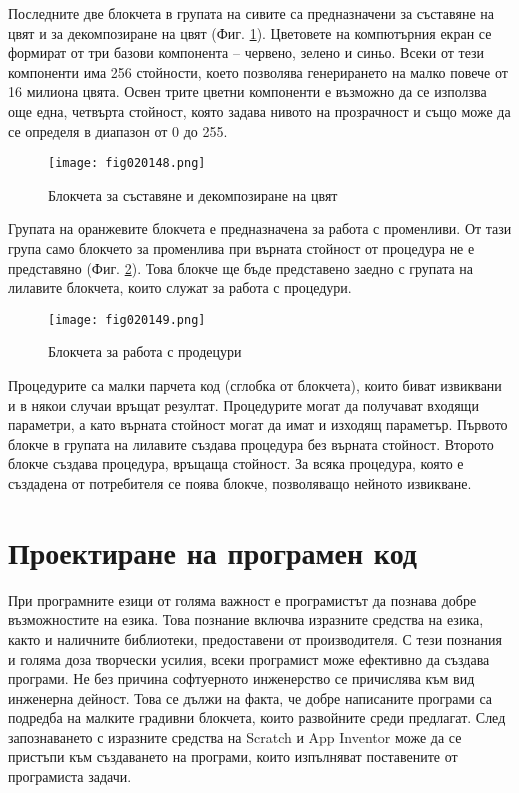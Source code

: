 Последните две блокчета в групата на сивите са предназначени за съставяне на цвят и за декомпозиране на цвят (Фиг. \ref{fig020148}). Цветовете на компютърния екран се формират от три базови компонента – червено, зелено и синьо. Всеки от тези компоненти има 256 стойности, което позволява генерирането на малко повече от 16 милиона цвята. Освен трите цветни компоненти е възможно да се използва още една, четвърта стойност, която задава нивото на прозрачност и също може да се определя в диапазон от 0 до 255.

\begin{figure}[H]
  \centering
  \texttt{[image: fig020148.png]}
  \caption{Блокчета за съставяне и декомпозиране на цвят}
\label{fig020148}
\end{figure}

Групата на оранжевите блокчета е предназначена за работа с променливи. От тази група само блокчето за променлива при върната стойност от процедура не е представяно (Фиг. \ref{fig020149}). Това блокче ще бъде представено заедно с групата на лилавите блокчета, които служат за работа с процедури.

\begin{figure}[H]
  \centering
  \texttt{[image: fig020149.png]}
  \caption{Блокчета за работа с продецури}
\label{fig020149}
\end{figure}

Процедурите са малки парчета код (сглобка от блокчета), които биват извиквани и в някои случаи връщат резултат. Процедурите могат да получават входящи параметри, а като върната стойност могат да имат и изходящ параметър. Първото блокче в групата на лилавите създава процедура без върната стойност. Второто блокче създава процедура, връщаща стойност. За всяка процедура, която е създадена от потребителя се поява блокче, позволяващо нейното извикване.

\section{Проектиране на програмен код}

При програмните езици от голяма важност е програмистът да познава добре възможностите на езика. Това познание включва изразните средства на езика, както и наличните библиотеки, предоставени от производителя. С тези познания и голяма доза творчески усилия, всеки програмист може ефективно да създава програми. Не без причина софтуерното инженерство се причислява към вид инженерна дейност. Това се дължи на факта, че добре написаните програми са подредба на малките градивни блокчета, които развойните среди предлагат. След запознаването с изразните средства на Scratch и App Inventor може да се пристъпи към създаването на програми, които изпълняват поставените от програмиста задачи.

